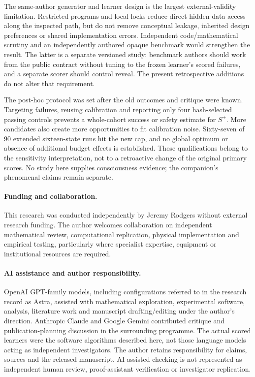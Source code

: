 The same-author generator and learner design is the largest external-validity limitation. Restricted programs and local locks reduce direct hidden-data access along the inspected path, but do not remove conceptual leakage, inherited design preferences or shared implementation errors. Independent code/mathematical scrutiny and an independently authored opaque benchmark would strengthen the result. The latter is a separate versioned study: benchmark authors should work from the public contract without tuning to the frozen learner's scored failures, and a separate scorer should control reveal. The present retrospective additions do not alter that requirement.



The post-hoc protocol was set after the old outcomes and critique were known. Targeting failures, reusing calibration and reporting only four hash-selected passing controls prevents a whole-cohort success or safety estimate for $S^+$. More candidates also create more opportunities to fit calibration noise. Sixty-seven of 90 extended sixteen-state runs hit the new cap, and no global optimum or absence of additional budget effects is established. These qualifications belong to the sensitivity interpretation, not to a retroactive change of the original primary scores. No study here supplies consciousness evidence; the companion's phenomenal claims remain separate.
\paragraph{Funding and collaboration.}
This research was conducted independently by Jeremy Rodgers without external research funding. The author welcomes collaboration on independent mathematical review, computational replication, physical implementation and empirical testing, particularly where specialist expertise, equipment or institutional resources are required.

\paragraph{AI assistance and author responsibility.}
OpenAI GPT-family models, including configurations referred to in the research record as Astra, assisted with mathematical exploration, experimental software, analysis, literature work and manuscript drafting/editing under the author's direction. Anthropic Claude and Google Gemini contributed critique and publication-planning discussion in the surrounding programme. The actual scored learners were the software algorithms described here, not those language models acting as independent investigators. The author retains responsibility for claims, sources and the released manuscript. AI-assisted checking is not represented as independent human review, proof-assistant verification or investigator replication.

